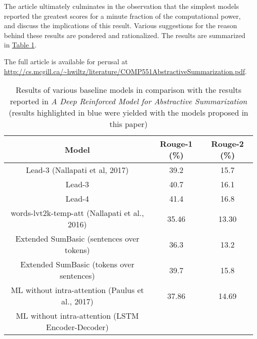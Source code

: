 \documentclass[10pt]{article}
\begin{document}
\begin{multicols}{2}
The article ultimately culminates in the observation that the simplest models reported the greatest
scores for a minute fraction of the computational power, and discuss the implications of this
result. Various suggestions for the reason behind these results are pondered and rationalized. The
results are summarized in \hyperref[tab:results]{Table \ref{tab:results}}.

The full article is available for perusal at
\url{http://cs.mcgill.ca/~hwiltz/literature/COMP551AbstractiveSummarization.pdf}.
\end{multicols}
\begin{table}[h]
	\footnotesize
    \begin{center}
        \begin{tabular}{|c|c|c|}
            \hline
            Model & Rouge-1 (\%) & Rouge-2 (\%) \\\hline
            Lead-3 (Nallapati et al, 2017) & 39.2 & 15.7\\\hline
            \color{blue}Lead-3 & \color{blue}40.7 & \color{blue}16.1\\\hline
            \color{blue}Lead-4 & \color{blue}41.4 & \color{blue}16.8\\\hline
            words-lvt2k-temp-att (Nallapati et al., 2016) & 35.46 & 13.30\\\hline
            \color{blue}Extended SumBasic (sentences over tokens) & \color{blue}36.3 & \color{blue}13.2\\\hline
            \color{blue}Extended SumBasic (tokens over sentences) & \color{blue}39.7 & \color{blue}15.8\\\hline
            ML without intra-attention (Paulus et al., 2017) & 37.86 & 14.69\\\hline
			\color{blue}ML without intra-attention (LSTM Encoder-Decoder) & \color{blue} &
			\color{blue} \\\hline
        \end{tabular}
        \caption{\footnotesize Results of various baseline models in comparison with the results reported in \textit{A Deep Reinforced Model for Abstractive Summarization} \color{blue}(results highlighted in blue were yielded with the models proposed in this paper)}
        \label{tab:results}
    \end{center}
\end{table}
\end{document}
